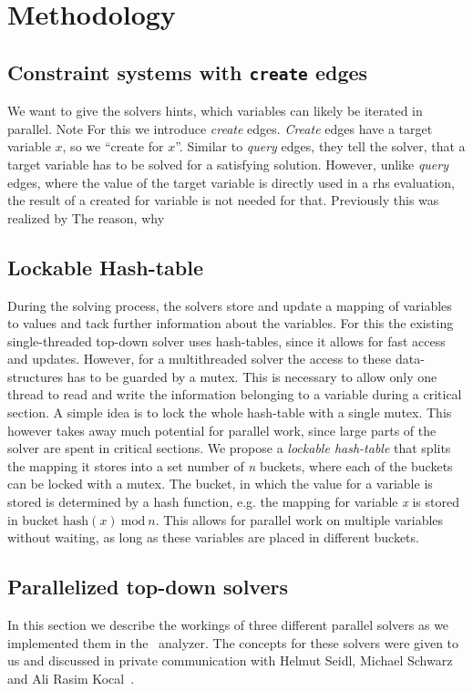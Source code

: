 \section{Methodology}
\label{sec:method}

  \subsection{Constraint systems with \texttt{create} edges}
  \label{sec:method:create}
  We want to give the solvers hints, which variables can likely be iterated in parallel.
  Note %
  For this we introduce \textit{create} edges. \textit{Create} edges have a target variable $x$, so we ``create for $x$''. Similar to \textit{query} edges, they tell the solver, that a target variable has to be solved for a satisfying solution. However, unlike \textit{query} edges, where the value of the target variable is directly used in a \ac{rhs} evaluation, the result of a created for variable is not needed for that. Previously this was realized by 
  The reason, why %

  \subsection{Lockable Hash-table}
  \label{sec:method:LHM}
  During the solving process, the solvers store and update a mapping of variables to values and tack further information about the variables. For this the existing single-threaded top-down solver uses hash-tables, since it allows for fast access and updates. However, for a multithreaded solver the access to these data-structures has to be guarded by a mutex. This is necessary to allow only one thread to read and write the information belonging to a variable during a critical section. 
  A simple idea is to lock the whole hash-table with a single mutex. This however takes away much potential for parallel work, since large parts of the solver are spent in critical sections.
  We propose a \textit{lockable hash-table} that splits the mapping it stores into a set number of \textit{n} buckets, where each of the buckets can be locked with a mutex. The bucket, in which the value for a variable is stored is determined by a hash function, e.g. the mapping for variable \textit{x} is stored in bucket $\text{hash}(x)\ \text{mod}\ n$. This allows for parallel work on multiple variables without waiting, as long as these variables are placed in different buckets.

  \subsection{Parallelized top-down solvers}
  \label{sec:method:td_parallel}
  In this section we describe the workings of three different parallel solvers as we implemented them in the \gob\ analyzer. The concepts for these solvers were given to us and discussed in private communication with Helmut Seidl, Michael Schwarz and Ali Rasim Kocal~\cite{privCom}. 

